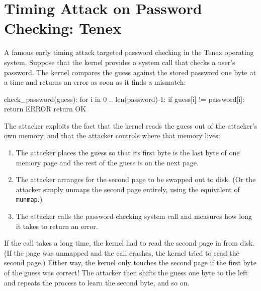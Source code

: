\documentclass[
  letterpaper,
]{scrbook}
\newenvironment{Shaded}{\begin{snugshade}}{\end{snugshade}}
\newcommand{\NormalTok}[1]{\textcolor[rgb]{0.00,0.23,0.31}{#1}}
\theoremstyle{definition}
\theoremstyle{plain}
\theoremstyle{plain}
\theoremstyle{remark}
\begin{document}
\chapter{Timing Attack on Password Checking: Tenex}\label{sec-sc-tenex}

A famous early timing attack targeted password checking in the Tenex
operating system. Suppose that the kernel provides a system call that
checks a user's password. The kernel compares the guess against the
stored password one byte at a time and returns an error as soon as it
finds a mismatch: {}

\begin{Shaded}
\begin{Highlighting}[]
\NormalTok{check\_password(guess):}
\NormalTok{    for i in 0 .. len(password){-}1:}
\NormalTok{        if guess[i] != password[i]:}
\NormalTok{            return ERROR}
\NormalTok{    return OK}
\end{Highlighting}
\end{Shaded}

The attacker exploits the fact that the kernel reads the guess out of
the attacker's own memory, and that the attacker controls where that
memory lives:

\begin{enumerate}
\def\labelenumi{\arabic{enumi}.}
\item
  The attacker places the guess so that its first byte is the last byte
  of one memory page and the rest of the guess is on the next page.
\item
  The attacker arranges for the second page to be swapped out to disk.
  (Or the attacker simply unmaps the second page entirely, using the
  equivalent of \texttt{munmap}.)
\item
  The attacker calls the password-checking system call and measures how
  long it takes to return an error.
\end{enumerate}

If the call takes a long time, the kernel had to read the second page in
from disk. (If the page was unmapped and the call crashes, the kernel
tried to read the second page.) Either way, the kernel only touches the
second page if the first byte of the guess was correct! The attacker
then shifts the guess one byte to the left and repeats the process to
learn the second byte, and so on.
\end{document}
